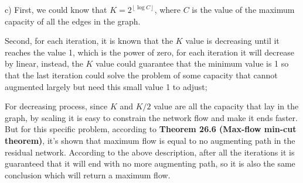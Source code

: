 \documentclass{article}
\begin{document}
c) First, we could know that $K=2^{\left \lfloor{\log{C}}\right \rfloor}$, where $C$ is the value of the maximum capacity of all the edges in the graph.

Second, for each iteration, it is known that the $K$ value is decreasing until it reaches the value 1, which is the power of zero, for each iteration it will decrease by linear, instead, the $K$ value could guarantee that the minimum
value is 1 so that the last iteration could solve the problem of some capacity that cannot augmented largely but need this small value 1 to adjust;

For decreasing process, since $K$  and $K/2$ value are all the capacity that lay in the graph, by scaling it is easy
to constrain the network flow and make it ends faster. But for this specific problem, according to \textbf{Theorem 26.6 (Max-flow min-cut theorem)}, it's shown that maximum flow is equal to no augmenting path in the residual network. According to the above description, after all the iterations it is guaranteed that it will end with no more augmenting path, so it is also the same conclusion which will return a maximum flow.
\end{document}
